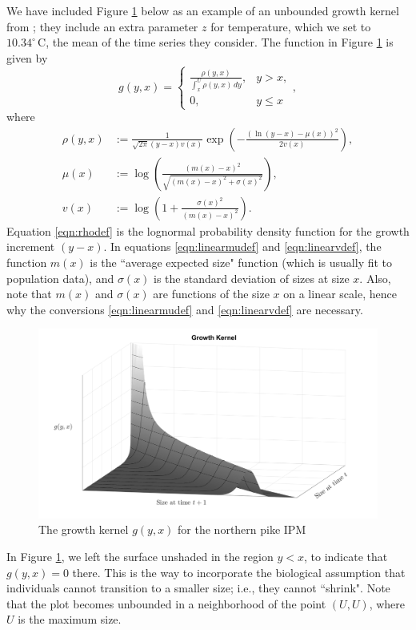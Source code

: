 \begin{example}
	We have included Figure \ref{fig:growth-kernel-plot} below as an example of an unbounded growth kernel from \cite{Vindenes2014}; they include an extra parameter $z$ for temperature, which we set to $10.34^\circ \, \text{C}$, the mean of the time series they consider. The function in Figure \ref{fig:growth-kernel-plot} is given by
	\[g(y, x) = \left\{ \begin{array}{lc} \frac{\rho(y, x)}{\int_x^U \rho(y, x) \, dy}, & y > x, \\ 0, & y \leq x \end{array} \right. ,\]
	where
\begin{align}
	\rho(y, x) &:= \frac{1}{\sqrt{2 \pi}(y - x) v(x)} \exp \left( - \frac{(\ln(y - x) - \mu(x))^2}{2 v(x)} \right), \label{eqn:rhodef}\\
	\mu(x) &:= \log \left( \frac{(m(x)-x)^2}{\sqrt{(m(x) - x)^2 + \sigma(x)^2}}\right), \label{eqn:linearmudef} \\
	v(x) &:= \log \left( 1 + \frac{\sigma(x)^2}{(m(x)-x)^2}\right).	\label{eqn:linearvdef}
\end{align}
	Equation \ref{eqn:rhodef} is the lognormal probability density function for the growth increment $(y - x)$. In equations \eqref{eqn:linearmudef} and \eqref{eqn:linearvdef}, the function $m(x)$ is the ``average expected size" function (which is usually fit to population data), and $\sigma(x)$ is the standard deviation of sizes at size $x$. Also, note that $m(x)$ and $\sigma(x)$ are functions of the size $x$ on a linear scale, hence why the conversions \eqref{eqn:linearmudef} and \eqref{eqn:linearvdef} are necessary.
	\begin{center}
		\begin{figure}
			\centering
			\includegraphics[width=\textwidth]{"Images/Growth Kernel Plot"}
			\caption{The growth kernel $g(y,x)$ for the northern pike IPM} \label{fig:growth-kernel-plot}
		\end{figure}
	\end{center}
	In Figure \ref{fig:growth-kernel-plot}, we left the surface unshaded in the region $y < x$, to indicate that $g(y,x) = 0$ there. This is the way to incorporate the biological assumption that individuals cannot transition to a smaller size; i.e., they cannot ``shrink". Note that the plot becomes unbounded in a neighborhood of the point $(U,U)$, where $U$ is the maximum size.
	
\end{example}

